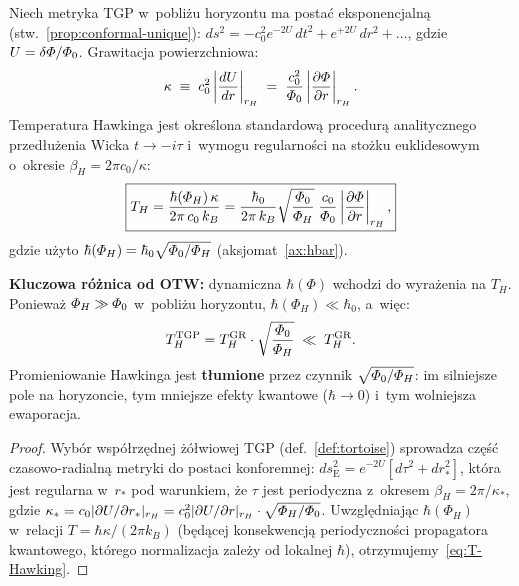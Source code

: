 \begin{proposition}\label{prop:T-Hawking}
Niech metryka TGP w~pobli\.zu horyzontu ma posta\'c
eksponencjaln\k{a} (stw.~\ref{prop:conformal-unique}):
$ds^2 = -c_0^2 e^{-2U}\,dt^2 + e^{+2U}\,dr^2 + \ldots$,
gdzie $U = \delta\varPhi/\varPhi_0$. Grawitacja powierzchniowa:
\begin{equation}\label{eq:surface-gravity}
    \kappa \;\equiv\; c_0^2\left|\frac{dU}{dr}\right|_{r_H}
    \;=\; \frac{c_0^2}{\varPhi_0}
      \left|\frac{\partial\varPhi}{\partial r}\right|_{r_H}.
\end{equation}
Temperatura Hawkinga jest okre\'slona standardow\k{a}
procedur\k{a} analitycznego przed\l{}u\.zenia Wicka
$t \to -i\tau$ i~wymogu regularno\'sci na sto\.zku
euklidesowym o~okresie $\beta_H = 2\pi c_0/\kappa$:
\begin{equation}\label{eq:T-Hawking}
    \boxed{
      T_H = \frac{\hbar(\varPhi_H)\,\kappa}{2\pi\,c_0\,k_B}
      = \frac{\hbar_0}{2\pi\,k_B}
        \sqrt{\frac{\varPhi_0}{\varPhi_H}}
        \;\frac{c_0}{\varPhi_0}
        \left|\frac{\partial\varPhi}{\partial r}\right|_{r_H},
    }
\end{equation}
gdzie u\.zyto $\hbar(\varPhi_H) = \hbar_0\sqrt{\varPhi_0/\varPhi_H}$
(aksjomat~\ref{ax:hbar}).

\medskip\noindent
\textbf{Kluczowa r\'o\.znica od OTW:} dynamiczna $\hbar(\Phi)$
wchodzi do wyra\.zenia na $T_H$. Poniewa\.z $\varPhi_H \gg \varPhi_0$
w~pobli\.zu horyzontu, $\hbar(\Phi_H) \ll \hbar_0$, a~wi\k{e}c:
\begin{equation}\label{eq:T-H-suppression}
    T_H^{\mathrm{TGP}} = T_H^{\mathrm{GR}}
      \cdot \sqrt{\frac{\varPhi_0}{\varPhi_H}}
    \;\ll\; T_H^{\mathrm{GR}}.
\end{equation}
Promieniowanie Hawkinga jest \textbf{t\l{}umione} przez czynnik
$\sqrt{\varPhi_0/\varPhi_H}$: im silniejsze pole na horyzoncie, tym
mniejsze efekty kwantowe ($\hbar \to 0$) i~tym wolniejsza
ewaporacja.
\end{proposition}

\begin{proof}
Wyb\'or wsp\'o\l{}rz\k{e}dnej \.z\'o\l{}wiowej TGP
(def.~\ref{def:tortoise}) sprowadza cz\k{e}\'s\'c czasowo-radialn\k{a}
metryki do postaci konforemnej:
$ds^2_{\mathrm{E}} = e^{-2U}[d\tau^2 + dr_*^2]$,
kt\'ora jest regularna w~$r_*$ pod warunkiem, \.ze $\tau$
jest periodyczna z~okresem $\beta_H = 2\pi/\kappa_*$,
gdzie $\kappa_* = c_0|\partial U/\partial r_*|_{r_H}
= c_0^2|\partial U/\partial r|_{r_H} \cdot \sqrt{\varPhi_H/\varPhi_0}$.
Uwzgl\k{e}dniaj\k{a}c $\hbar(\Phi_H)$ w~relacji $T = \hbar\kappa/(2\pi k_B)$
(b\k{e}d\k{a}cej konsekwencj\k{a} periodyczno\'sci propagatora
kwantowego, kt\'orego normalizacja zale\.zy od lokalnej $\hbar$),
otrzymujemy~\eqref{eq:T-Hawking}.
\end{proof}

